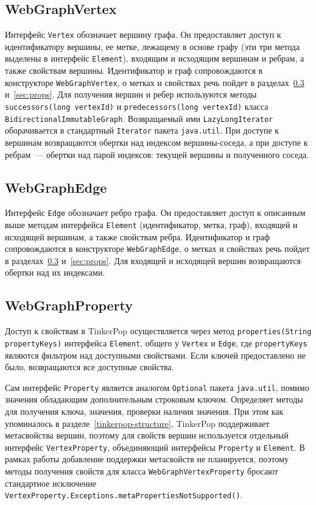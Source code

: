 \documentclass[times,specification,annotation]{itmo-student-thesis}
\begin{document}
\subsection{WebGraphVertex}\label{subsec:webgraphvertex}

Интерфейс \texttt{Vertex} обозначает вершину графа. Он предоставляет доступ к идентификатору вершины, ее метке, лежащему в основе графу (эти три метода выделены в интерфейс \texttt{Element}), входящим и исходящим вершинам и ребрам, а также свойствам вершины.
Идентификатор и граф сопровождаются в конструкторе \texttt{WebGraphVertex}, о метках и свойствах речь пойдет в разделах~\ref{subsec:webgraphproperty} и~\ref{sec:props}.
Для получения вершин и ребер используются методы \texttt{successors(long vertexId)} и \texttt{predecessors(long vertexId)} класса \texttt{BidirectionalImmutableGraph}. Возвращаемый ими \texttt{LazyLongIterator} оборачивается в стандартный \texttt{Iterator} пакета \texttt{java.util}. При доступе к вершинам возвращаются обертки над индексом вершины-соседа, а при доступе к ребрам~--- обертки над парой индексов: текущей вершины и полученного соседа.

\subsection{WebGraphEdge}\label{subsec:webgraphedge}

Интерфейс \texttt{Edge} обозначает ребро графа. Он предоставляет доступ к описанным выше методам интерфейса \texttt{Element} (идентификатор, метка, граф), входящей и исходящей вершинам, а также свойствам ребра. Идентификатор и граф сопровождаются в конструкторе \texttt{WebGraphEdge}, о метках и свойствах речь пойдет в разделах~\ref{subsec:webgraphproperty} и~\ref{sec:props}.
Для входящей и исходящей вершин возвращаются обертки над их индексами.

\subsection{WebGraphProperty}\label{subsec:webgraphproperty}

Доступ к свойствам в TinkerPop осуществляется через метод \texttt{properties(String propertyKeys)} интерфейса \texttt{Element}, общего у \texttt{Vertex} и \texttt{Edge}, где \texttt{propertyKeys} являются фильтром над доступными свойствами. Если ключей предоставлено не было, возвращаются все доступные свойства.

Сам интерфейс \texttt{Property} является аналогом \texttt{Optional} пакета \texttt{java.util}, помимо значения обладающим дополнительным строковым ключом. Определяет методы для получения ключа, значения, проверки наличия значения. При этом как упоминалось в разделе~\ref{tinkerpop-structure}, TinkerPop поддерживает метасвойства вершин, поэтому для свойств вершин используется отдельный интерфейс \texttt{VertexProperty}, объединяющий интерфейсы \texttt{Property} и \texttt{Element}. В рамках работы добавление поддержки метасвойств не планируется, поэтому методы получения свойств для класса \texttt{WebGraphVertexProperty} бросают стандартное исключение \texttt{VertexProperty.Exceptions.metaPropertiesNotSupported()}.
\end{document}
